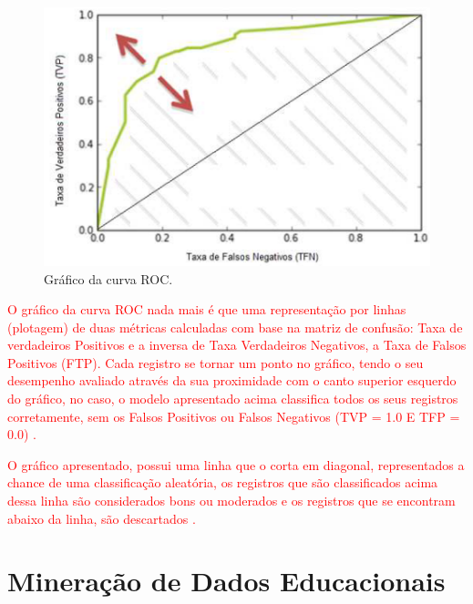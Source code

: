 \par
\begin{figure}[!htp]
	\begin{center}
    \caption{\label{fig:waveform_fig} Gráfico da curva ROC.}
	\includegraphics[scale=0.80]{Figuras/Curva_roc.png}
	\end{center}
\end{figure}

\par
\textcolor{red}{O gráfico da curva ROC nada mais é que uma representação por linhas (plotagem) de duas métricas calculadas com base na matriz de confusão: Taxa de verdadeiros Positivos e a inversa de Taxa Verdadeiros Negativos, a Taxa de Falsos Positivos (FTP). Cada registro se tornar um ponto no gráfico, tendo o seu desempenho avaliado através da sua proximidade com o canto superior esquerdo do gráfico, no caso, o modelo apresentado acima classifica todos os seus registros corretamente, sem os Falsos Positivos ou Falsos Negativos (TVP = 1.0 E TFP = 0.0) \cite{Cesar, Carvalho2014}.}

\par
\textcolor{red}{O gráfico apresentado, possui uma linha que o corta em diagonal, representados a chance de uma classificação aleatória, os registros que são classificados acima dessa linha são considerados bons ou moderados e os registros que se encontram abaixo da linha, são descartados \cite{Carvalho2014}.}



\section{Mineração de Dados Educacionais}

